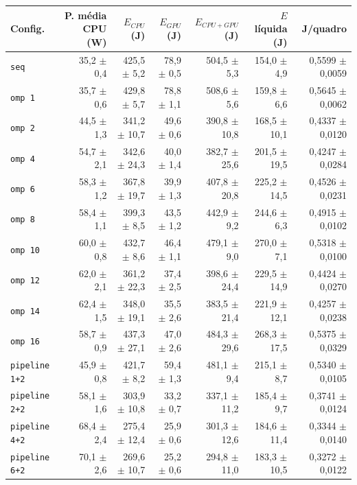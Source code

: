 \begin{tabular}{lrrrrrr}
\hline
\textbf{Config.} & \textbf{P. m\'edia CPU (W)} & \textbf{$E_{CPU}$ (J)} & \textbf{$E_{GPU}$ (J)} & \textbf{$E_{CPU+GPU}$ (J)} & \textbf{$E$ l\'iquida (J)} & \textbf{J/quadro} \\
\hline
\texttt{seq} & 35,2 $\pm$ 0,4 & 425,5 $\pm$ 5,2 & 78,9 $\pm$ 0,5 & 504,5 $\pm$ 5,3 & 154,0 $\pm$ 4,9 & 0,5599 $\pm$ 0,0059 \\
\texttt{omp 1} & 35,7 $\pm$ 0,6 & 429,8 $\pm$ 5,7 & 78,8 $\pm$ 1,1 & 508,6 $\pm$ 5,6 & 159,8 $\pm$ 6,6 & 0,5645 $\pm$ 0,0062 \\
\texttt{omp 2} & 44,5 $\pm$ 1,3 & 341,2 $\pm$ 10,7 & 49,6 $\pm$ 0,6 & 390,8 $\pm$ 10,8 & 168,5 $\pm$ 10,1 & 0,4337 $\pm$ 0,0120 \\
\texttt{omp 4} & 54,7 $\pm$ 2,1 & 342,6 $\pm$ 24,3 & 40,0 $\pm$ 1,4 & 382,7 $\pm$ 25,6 & 201,5 $\pm$ 19,5 & 0,4247 $\pm$ 0,0284 \\
\texttt{omp 6} & 58,3 $\pm$ 1,2 & 367,8 $\pm$ 19,7 & 39,9 $\pm$ 1,3 & 407,8 $\pm$ 20,8 & 225,2 $\pm$ 14,5 & 0,4526 $\pm$ 0,0231 \\
\texttt{omp 8} & 58,4 $\pm$ 1,1 & 399,3 $\pm$ 8,5 & 43,5 $\pm$ 1,2 & 442,9 $\pm$ 9,2 & 244,6 $\pm$ 6,3 & 0,4915 $\pm$ 0,0102 \\
\texttt{omp 10} & 60,0 $\pm$ 0,8 & 432,7 $\pm$ 8,6 & 46,4 $\pm$ 1,1 & 479,1 $\pm$ 9,0 & 270,0 $\pm$ 7,1 & 0,5318 $\pm$ 0,0100 \\
\texttt{omp 12} & 62,0 $\pm$ 2,1 & 361,2 $\pm$ 22,3 & 37,4 $\pm$ 2,5 & 398,6 $\pm$ 24,4 & 229,5 $\pm$ 14,9 & 0,4424 $\pm$ 0,0270 \\
\texttt{omp 14} & 62,4 $\pm$ 1,5 & 348,0 $\pm$ 19,1 & 35,5 $\pm$ 2,6 & 383,5 $\pm$ 21,4 & 221,9 $\pm$ 12,1 & 0,4257 $\pm$ 0,0238 \\
\texttt{omp 16} & 58,7 $\pm$ 0,9 & 437,3 $\pm$ 27,1 & 47,0 $\pm$ 2,6 & 484,3 $\pm$ 29,6 & 268,3 $\pm$ 17,5 & 0,5375 $\pm$ 0,0329 \\
\texttt{pipeline 1+2} & 45,9 $\pm$ 0,8 & 421,7 $\pm$ 8,2 & 59,4 $\pm$ 1,3 & 481,1 $\pm$ 9,4 & 215,1 $\pm$ 8,7 & 0,5340 $\pm$ 0,0105 \\
\texttt{pipeline 2+2} & 58,1 $\pm$ 1,6 & 303,9 $\pm$ 10,8 & 33,2 $\pm$ 0,7 & 337,1 $\pm$ 11,2 & 185,4 $\pm$ 9,7 & 0,3741 $\pm$ 0,0124 \\
\texttt{pipeline 4+2} & 68,4 $\pm$ 2,4 & 275,4 $\pm$ 12,4 & 25,9 $\pm$ 0,6 & 301,3 $\pm$ 12,6 & 184,6 $\pm$ 11,4 & 0,3344 $\pm$ 0,0140 \\
\texttt{pipeline 6+2} & 70,1 $\pm$ 2,6 & 269,6 $\pm$ 10,7 & 25,2 $\pm$ 0,6 & 294,8 $\pm$ 11,0 & 183,3 $\pm$ 10,5 & 0,3272 $\pm$ 0,0122 \\

\end{tabular}
